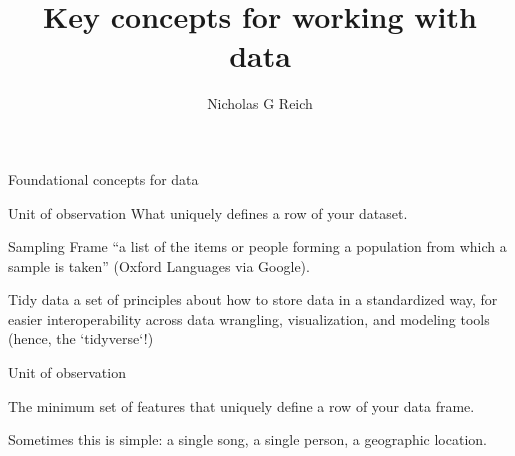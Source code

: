 \documentclass[table]{beamer}\usepackage[]{graphicx}\usepackage[]{color}
\title{Key concepts for working with data}
\author{Nicholas G Reich}
\begin{document}
\begin{frame}[plain]
	\titlepage
\end{frame}






\begin{frame}{Foundational concepts for data}


\begin{block}{Unit of observation}
\bi
	\myitem What uniquely defines a row of your dataset.
\ei
\end{block}


\begin{block}{Sampling Frame}
\bi
	\myitem ``a list of the items or people forming a population from which a sample is taken'' (Oxford Languages via Google).
\ei
\end{block}


\begin{block}{Tidy data}
\bi
	\myitem a set of principles about how to store data in a standardized way, for easier interoperability across data wrangling, visualization, and modeling tools (hence, the `tidyverse`!)
\ei
\end{block}



\end{frame}


\begin{frame}{Unit of observation}

The minimum set of features that uniquely define a row of your data frame.

\vspace{4em}

Sometimes this is simple: a single song, a single person, a geographic location.


%

\end{frame}
\end{document}
